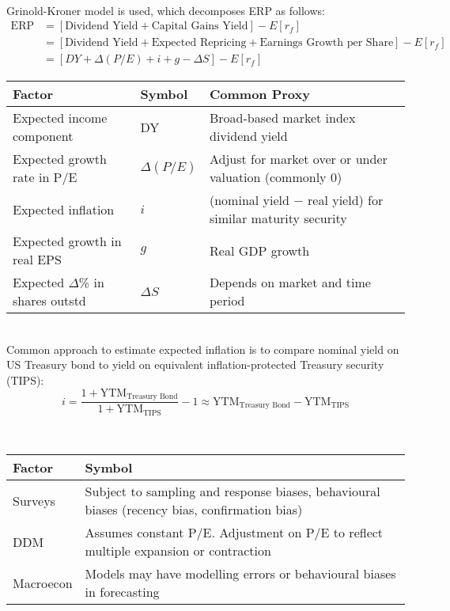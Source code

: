 \begin{method} \\
Grinold-Kroner model is used, which decomposes ERP as follows:
\begin{align}
\text{ERP} &= [\text{Dividend Yield} + \text{Capital Gains Yield}] - E[r_f] \nonumber \\
&= [\text{Dividend Yield} + \text{Expected Repricing} + \text{Earnings Growth per Share}] - E[r_f] \nonumber \\
&= \left[DY + \Delta (P/E) + i + g - \Delta S \right] - E[r_f] \nonumber
\end{align}
\begin{tabularx}{\textwidth}{p{14em}|p{4em}|X}
\hline
\rowcolor{gray!30}
Factor & Symbol & Common Proxy \\
\hline
Expected income component & DY & Broad-based market index dividend yield \\
\hline
Expected growth rate in P/E & $\Delta (P/E)$ & Adjust for market over or under valuation (commonly $0$) \\	
\hline
Expected inflation & $i$ & (nominal yield $-$ real yield) for similar maturity security \\
\hline
Expected growth in real EPS & $g$ & Real GDP growth \\
\hline
Expected $\Delta$\% in shares outstd & $\Delta S$ & Depends on market and time period \\
\hline
\end{tabularx}\\

Common approach to estimate expected inflation is to compare nominal yield on US Treasury bond to yield on equivalent inflation-protected Treasury security (TIPS):
\begin{equation}
i = \frac{1 + \text{YTM}_{\text{Treasury Bond}}}{1 + \text{YTM}_{\text{TIPS}}} - 1 \approx \text{YTM}_{\text{Treasury Bond}} - \text{YTM}_{\text{TIPS}} \nonumber
\end{equation}
\end{method}

\begin{remark} \\
\begin{tabularx}{\textwidth}{p{5em}|X}
\hline
\rowcolor{gray!30}
Factor & Symbol \\
\hline
Surveys & Subject to sampling and response biases, behavioural biases (recency bias, confirmation bias) \\
\hline
DDM & Assumes constant P/E. Adjustment on P/E to reflect multiple expansion or contraction \\
\hline
Macroecon & Models may have modelling errors or behavioural biases in forecasting \\
\hline
\end{tabularx}
\end{remark}

